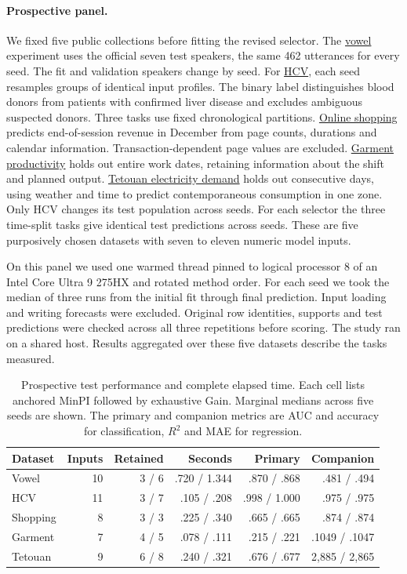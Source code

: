 \paragraph{Prospective panel.}
We fixed five public collections before fitting the revised selector. The \href{https://doi.org/10.24432/C58P4S}{vowel} experiment uses the official seven test speakers, the same 462 utterances for every seed. The fit and validation speakers change by seed. For \href{https://doi.org/10.24432/C5D612}{HCV}, each seed resamples groups of identical input profiles. The binary label distinguishes blood donors from patients with confirmed liver disease and excludes ambiguous suspected donors. Three tasks use fixed chronological partitions. \href{https://doi.org/10.24432/C5F88Q}{Online shopping} predicts end-of-session revenue in December from page counts, durations and calendar information. Transaction-dependent page values are excluded. \href{https://doi.org/10.24432/C51S6D}{Garment productivity} holds out entire work dates, retaining information about the shift and planned output. \href{https://doi.org/10.24432/C5B034}{Tetouan electricity demand} holds out consecutive days, using weather and time to predict contemporaneous consumption in one zone. Only HCV changes its test population across seeds. For each selector the three time-split tasks give identical test predictions across seeds. These are five purposively chosen datasets with seven to eleven numeric model inputs.

On this panel we used one warmed thread pinned to logical processor 8 of an Intel Core Ultra 9 275HX and rotated method order. For each seed we took the median of three runs from the initial fit through final prediction. Input loading and writing forecasts were excluded. Original row identities, supports and test predictions were checked across all three repetitions before scoring. The study ran on a shared host. Results aggregated over these five datasets describe the tasks measured.

\begin{table}[htbp]
\centering
\caption{Prospective test performance and complete elapsed time. Each cell lists anchored MinPI followed by exhaustive Gain. Marginal medians across five seeds are shown. The primary and companion metrics are AUC and accuracy for classification, $R^2$ and MAE for regression.}
\label{tab:anchor-main}
\small
\begin{tabular}{lrrrrr}
\toprule
Dataset & Inputs & Retained & Seconds & Primary & Companion\\
\midrule
Vowel      & 10 & 3 / 6 & .720 / 1.344 & .870 / .868 & .481 / .494\\
HCV        & 11 & 3 / 7 & .105 / .208 & .998 / 1.000 & .975 / .975\\
Shopping   & 8  & 3 / 3 & .225 / .340 & .665 / .665 & .874 / .874\\
Garment    & 7  & 4 / 5 & .078 / .111 & .215 / .221 & .1049 / .1047\\
Tetouan    & 9  & 6 / 8 & .240 / .321 & .676 / .677 & 2,885 / 2,865\\
\bottomrule
\end{tabular}
\end{table}

